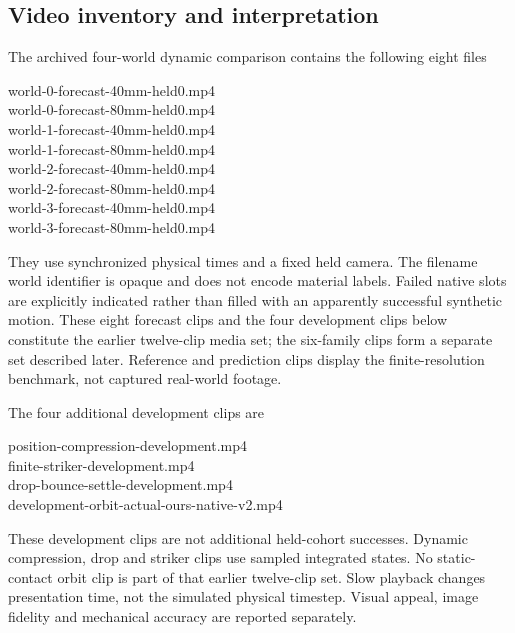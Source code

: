 \documentclass[10pt,twocolumn,letterpaper]{article}
\begin{document}
\subsection{Video inventory and interpretation}
The archived four-world dynamic comparison contains the following eight files
\begin{center}
\small\ttfamily
world-0-forecast-40mm-held0.mp4\\
world-0-forecast-80mm-held0.mp4\\
world-1-forecast-40mm-held0.mp4\\
world-1-forecast-80mm-held0.mp4\\
world-2-forecast-40mm-held0.mp4\\
world-2-forecast-80mm-held0.mp4\\
world-3-forecast-40mm-held0.mp4\\
world-3-forecast-80mm-held0.mp4
\end{center}
They use synchronized physical times and a fixed held camera. The filename world identifier is opaque and does not encode material labels. Failed native slots are explicitly indicated rather than filled with an apparently successful synthetic motion. These eight forecast clips and the four development clips below constitute the earlier twelve-clip media set; the six-family clips form a separate set described later. Reference and prediction clips display the finite-resolution benchmark, not captured real-world footage.

The four additional development clips are
\begin{center}
\small\ttfamily
position-compression-development.mp4\\
finite-striker-development.mp4\\
drop-bounce-settle-development.mp4\\
development-orbit-actual-ours-native-v2.mp4
\end{center}
These development clips are not additional held-cohort successes. Dynamic compression, drop and striker clips use sampled integrated states. No static-contact orbit clip is part of that earlier twelve-clip set. Slow playback changes presentation time, not the simulated physical timestep. Visual appeal, image fidelity and mechanical accuracy are reported separately.
\end{document}
